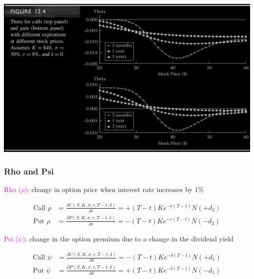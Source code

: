 \begin{frame}[fragile]
\begin{center}
	\includegraphics[scale=0.2]{figs/Figure-12-4.png}
\end{center}
\end{frame}
\begin{frame}[fragile]
	\frametitle{Rho and Psi}
	\centering

	\textcolor{magenta}{Rho ($\rho$)}: change in option price when interest rate increases by 1\%
	\bigskip

	\begin{align*}
		\text{Call $\rho$} & = \frac{\partial C(S,K,\sigma,r,T-t,\delta)}{\partial r} = +(T-t)Ke^{-r(T-t)} N(+d_2) \\
		\text{Put $\rho$}  & = \frac{\partial P(S,K,\sigma,r,T-t,\delta)}{\partial r} = -(T-t)Ke^{-r(T-t)} N(-d_2)
	\end{align*}

	\vfill
	\mySeparateLine
	\vfill

	\textcolor{magenta}{Psi ($\psi$)}: change in the option premium due to a change in the dividend yield

	\begin{align*}
		\text{Call $\psi$} & = \frac{\partial C(S,K,\sigma,r,T-t,\delta)}{\partial \delta} = -(T-t)Ke^{-\delta(T-t)} N(+d_1) \\
		\text{Put $\psi$}  & = \frac{\partial P(S,K,\sigma,r,T-t,\delta)}{\partial \delta} = +(T-t)Ke^{-\delta(T-t)} N(-d_1)
	\end{align*}
\end{frame}

